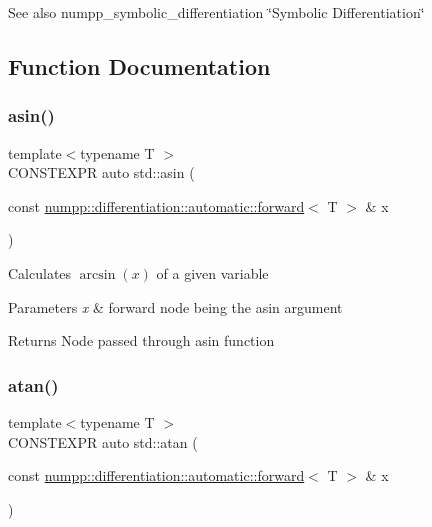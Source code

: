 \begin{DoxySeeAlso}{See also}
numpp\+\_\+symbolic\+\_\+differentiation \char`\"{}\+Symbolic Differentiation\char`\"{} 
\end{DoxySeeAlso}


\subsection{Function Documentation}
\mbox{\label{group__numpp__differentiation__forward__automatic_ga2db415f6b1d59e1f1679ff7bbf4c426b}} 
\subsubsection{\texorpdfstring{asin()}{asin()}}
{\footnotesize\ttfamily template$<$typename T $>$ \\
C\+O\+N\+S\+T\+E\+X\+PR auto std\+::asin (\begin{DoxyParamCaption}\item[{const \hyperlink{classnumpp_1_1differentiation_1_1automatic_1_1forward}{numpp\+::differentiation\+::automatic\+::forward}$<$ T $>$ \&}]{x }\end{DoxyParamCaption})}

Calculates $\arcsin(x)$ of a given variable 
\begin{DoxyParams}{Parameters}
{\em x} & forward node being the asin argument \\
\hline
\end{DoxyParams}
\begin{DoxyReturn}{Returns}
Node passed through asin function
\end{DoxyReturn}
\mbox{\label{group__numpp__differentiation__forward__automatic_ga9547d13665c214d44b017b140ccc1a3e}} 
\subsubsection{\texorpdfstring{atan()}{atan()}}
{\footnotesize\ttfamily template$<$typename T $>$ \\
C\+O\+N\+S\+T\+E\+X\+PR auto std\+::atan (\begin{DoxyParamCaption}\item[{const \hyperlink{classnumpp_1_1differentiation_1_1automatic_1_1forward}{numpp\+::differentiation\+::automatic\+::forward}$<$ T $>$ \&}]{x }\end{DoxyParamCaption})}

